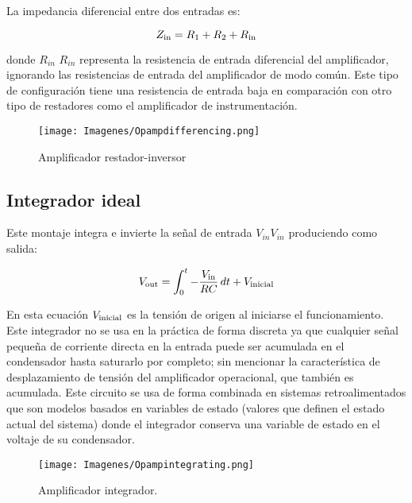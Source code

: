 \documentclass{article}
\begin{document}
La impedancia diferencial entre dos entradas es:

\begin{equation}
{\displaystyle Z_{\rm {in}}=R_{1}+R_{2}+R_{\rm {in}}}
\end{equation}

donde ${\displaystyle R_{in}}$ ${\displaystyle R_{in}}$ representa la resistencia de entrada diferencial del amplificador, ignorando las resistencias de entrada del amplificador de modo común. Este tipo de configuración tiene una resistencia de entrada baja en comparación con otro tipo de restadores como el amplificador de instrumentación.\citep{AmplificadorOperacional}

\begin{figure}[h!]
    \centering
    \texttt{[image: Imagenes/Opampdifferencing.png]}
    \caption{Amplificador restador-inversor\citep{AmplificadorOperacional}}
    \label{fig:my_label}
\end{figure}

\subsection{Integrador ideal}

Este montaje integra e invierte la señal de entrada ${\displaystyle V_{in}} {\displaystyle V_{in}}$ produciendo como salida:

\begin{equation}
    {\displaystyle V_{\rm {out}}=\int _{0}^{t}-{V_{\rm {in}} \over RC}\,dt+V_{\rm {inicial}}} 
\end{equation}

En esta ecuación ${\displaystyle V_{\rm {inicial}}}$  es la tensión de origen al iniciarse el funcionamiento.\citep{AmplificadorOperacional}\\

Este integrador no se usa en la práctica de forma discreta ya que cualquier señal pequeña de corriente directa en la entrada puede ser acumulada en el condensador hasta saturarlo por completo; sin mencionar la característica de desplazamiento de tensión del amplificador operacional, que también es acumulada. Este circuito se usa de forma combinada en sistemas retroalimentados que son modelos basados en variables de estado (valores que definen el estado actual del sistema) donde el integrador conserva una variable de estado en el voltaje de su condensador.\citep{AmplificadorOperacional}

\begin{figure}[h!]
    \centering
    \texttt{[image: Imagenes/Opampintegrating.png]}
    \caption{Amplificador integrador.\citep{AmplificadorOperacional}}
    \label{fig:opAmpIntegrador}
\end{figure}
\end{document}
